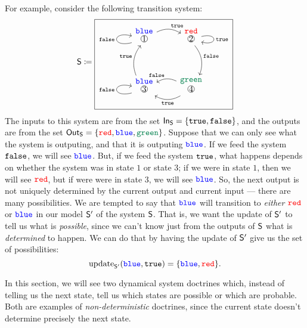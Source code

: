 \documentclass[DynamicalBook]{subfiles}
\begin{document}
For example, consider the following transition system:
\begin{equation}\label{eqn.possibilistic_transition_1}
\Sys{S} \coloneqq
  \begin{tikzpicture}[baseline=(bl)]
	\node[draw] (bl) {
  \begin{tikzcd}[column sep=small]
    \LMOO{1}{\Blue} \ar[loop left, "\const{false}"] \ar[rr, bend left, "\const{true}"] \ar[dd, leftarrow, bend right, "\true"'] &  & \LMOO{2}{\Red} \ar[loop right, "\true"] \ar[dd, bend left, "\const{false}" ]\\
    & & \\
    \LMOO{3}{\Blue} \ar[loop left, "\false"] \ar[rr, leftarrow, bend left, "\false"] \ar[rr, leftarrow, bend right, "\true"'] & & \LMOO{4}{\Green}
  \end{tikzcd}};
\end{tikzpicture}
\end{equation}
The inputs to this system are from the set $\mathsf{In}_{\mathsf{S}} = \{\mathtt{true}, \mathtt{false}\}$, and
the outputs are from the set $\Out{S} = \{\Red, \Blue, \Green\}$. Suppose that we can only see
what the system is outputing, and that it is outputing ${\color{blue} \mathtt{blue}}$. If we feed the
system $\mathtt{false}$, we will see ${\color{blue} \mathtt{blue}}$. But, if we feed the system $\mathtt{true}$, what
happens depends on whether the system was in state $1$ or state $3$; if we were
in state $1$, then we will see ${\color{red} \mathtt{red}}$, but if were were in state $3$, we will
see ${\color{blue} \mathtt{blue}}$. So, the next output is not uniquely determined by the current
output and current input --- there are many possibilities. We are tempted to say
that ${\color{blue} \mathtt{blue}}$ will transition to \emph{either} ${\color{red} \mathtt{red}}$ or ${\color{blue} \mathtt{blue}}$ in our model
$\mathsf{S'}$ of the system $\mathsf{S}$. That is, we want the update of $\mathsf{S'}$ to
tell us what is \emph{possible}, since we can't know just from the outputs of
$\mathsf{S}$ what is \emph{determined} to happen. We can do that by having the
update of $\mathsf{S'}$ give us the set of possibilities:
$$\mathrm{update}_{\mathsf{S'}}({\color{blue} \mathtt{blue}}, \mathtt{true}) = \{{\color{blue} \mathtt{blue}}, {\color{red} \mathtt{red}}\}.$$


In this section, we will see two dynamical system doctrines which, instead of
telling us the next state, tell us which states are possible or which are
probable. Both are examples of \emph{non-deterministic} doctrines, since the
current state doesn't determine precisely the next state.
\end{document}
